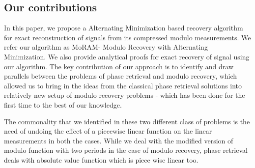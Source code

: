 
\subsection{Our contributions}
In this paper, we propose a Alternating Minimization based recovery algorithm for exact reconstruction of signals from its compressed modulo measurements. We refer our algorithm as MoRAM- Modulo Recovery with Alternating Minimization. We also provide analytical proofs for exact recovery of signal using our algorithm. The key contribution of our approach is to identify and draw parallels between the problems of phase retrieval and modulo recovery, which allowed us to bring in the ideas from the classical phase retrieval solutions into relatively new setup of modulo recovery problems - which has been done for the first time to the best of our knowledge. 

The commonality that we identified in these two different class of problems is the need of undoing the effect of a piecewise linear function on the linear measurements in both the cases. While we deal with the modified version of modulo function with two periods in the case of modulo recovery, phase retrieval deals with absolute value function which is piece wise linear too. 

